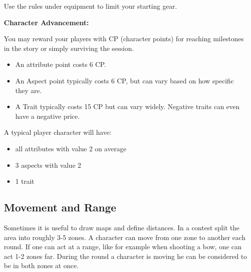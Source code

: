 \documentclass[11pt]{article}
\begin{document}
{\begin{short}
Use the rules under equipment to limit your starting gear.

\textbf{Character Advancement:}

You may reward your players with CP (character points) for reaching milestones in the story or simply surviving the session.

\begin{itemize}
\item An attribute point costs 6 CP.
\item An Aspect point typically costs 6 CP, but can vary based on how specific they are.
\item A Trait typically costs 15 CP but can vary widely. Negative traits can even have a negative price.
\end{itemize}

A typical player character will have:
\begin{itemize}
\item all attributes with value 2 on average
\item 3 aspects with value 2
\item 1 trait
\end{itemize}
\end{short}
\subsection{Movement and Range}
\label{sec:org17afd8d}
\begin{short}
Sometimes it is useful to draw maps and define distances. In a contest split the area into roughly 3-5 zones. A character can move from one zone to another each round. If one can act at a range, like for example when shooting a bow, one can act 1-2 zones far. During the round a character is moving he can be considered to be in both zones at once.
\end{short}
}
\end{document}

